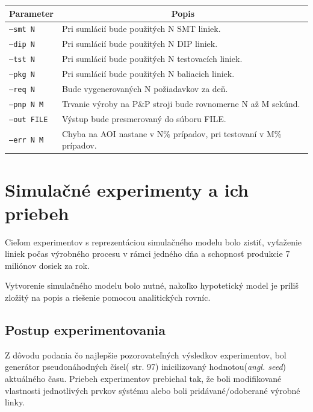 \documentclass[12pt,a4paper,titlepage,final]{article}
\begin{document}
\begin{table}[h]
\centering
\begin{tabular}{|l|l|}
\hline
\multicolumn{1}{|c|}{\textbf{Parameter}} & \multicolumn{1}{c|}{\textbf{Popis}}  \\ \hline
\texttt{--smt N}    & Pri sumlácií bude použitých N SMT liniek.                          \\ \hline
\texttt{--dip N}    & Pri sumlácií bude použitých N DIP liniek.                          \\ \hline
\texttt{--tst N}    & Pri sumlácií bude použitých N testovacích liniek.                  \\ \hline
\texttt{--pkg N}    & Pri sumlácií bude použitých N baliacich liniek.                    \\ \hline
\texttt{--req N}    & Bude vygenerovaných N požiadavkov za deň.                          \\ \hline
\texttt{--pnp N M}  & Trvanie výroby na P\&P stroji bude rovnomerne N až M sekúnd.       \\ \hline
\texttt{--out FILE} & Výstup bude presmerovaný do súboru FILE.                           \\ \hline
\texttt{--err N M}  & Chyba na AOI nastane v N\% prípadov, pri testovaní v M\% prípadov. \\ \hline
\end{tabular}
\end{table}


\section{Simulačné experimenty a ich priebeh}
Cieľom experimentov s reprezentáciou simulačného modelu bolo zistiť, vyťaženie
liniek počas výrobného procesu v rámci jedného dňa a schopnosť produkcie 7 miliónov
dosiek za rok\cite{gigabyte-sprava}.

Vytvorenie simulačného modelu bolo nutné, nakoľko hypotetický model je príliš
zložitý na popis a riešenie pomocou analitických rovníc.

\subsection{Postup experimentovania}
Z dôvodu podania čo najlepšie pozorovateľných výsledkov experimentov, bol 
generátor pseudonáhodných čísel(\cite{peringer-slidy} str. 97) inicilizovaný hodnotou(\textit{angl. seed})
aktuálného času. Priebeh experimentov prebiehal tak, že boli modifikované 
vlastnosti jednotlivých prvkov sýstému alebo boli pridávané/odoberané výrobné
linky.
\end{document}
